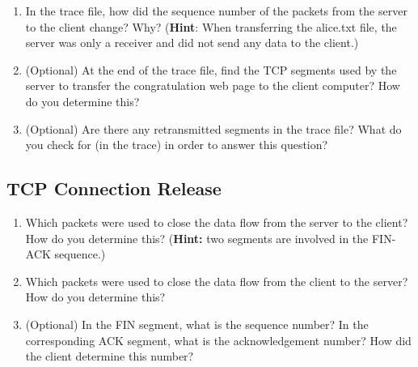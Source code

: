 \begin{enumerate}

\item In the trace file, how did the sequence number of the packets 
  from the server to the client change? Why? (\textbf{Hint}: 
  When transferring the alice.txt file, the server was only a receiver 
  and did not send any data to the client.)

\item (Optional) At the end of the trace file, find the TCP segments used by the
  server to transfer the congratulation web page to the client
  computer? How do you determine this?


\item (Optional) Are there any retransmitted segments in the trace
  file? What do you check for (in the trace) in order to answer this
  question?


\end{enumerate}

\subsection{TCP Connection Release}\label{sec:2.4.4}
\begin{enumerate}
\item Which packets were used to close the data flow from the server
  to the client? How do you determine this? ({\bf Hint:} two segments
  are involved in the FIN-ACK sequence.)
\item Which packets were used to close the data flow from the client
  to the server? How do you determine this?
\item (Optional) In the FIN segment, what is the sequence number? In the
  corresponding ACK segment, what is the acknowledgement number? How
  did the client determine this number?
\end{enumerate}




